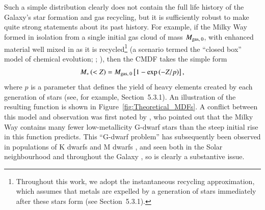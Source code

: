 \documentclass[fleqn,usenatbib]{mnras}
\begin{document}
Such a simple distribution clearly does not contain the full life history of the Galaxy's star formation and gas recycling, but it is sufficiently robust to make quite strong statements about its past history. For example, if the Milky Way formed in isolation from a single initial gas cloud of mass $ M_{\rm{gas,} \: 0}$, with enhanced material well mixed in as it is recycled\footnote{Throughout this work, we adopt the instantaneous recycling approximation, which assumes that metals are expelled by a generation of stars immediately after these stars form (see \citealp{Binney1998GalacticAstronomy} Section~5.3.1).} (a scenario termed the ``closed box'' model of chemical evolution; \citealp{Talbot1971TheModel}; \citealp{Tinsley1974ConstraintsNeighborhood}), then the CMDF takes the simple form 
\begin{equation}
    M_{*} \left( < Z \right) = M_{\rm{gas,} \: 0} \left[ 1 - \exp{ \left( -Z / p \right)} \right],
	\label{eq:closed_box}
\end{equation}
where $p$ is a parameter that defines the yield of heavy elements created by each generation of stars (see, for example, \citealp{Binney1998GalacticAstronomy} Section~5.3.1). An illustration of the resulting function is shown in Figure~\ref{fig:Theoretical_MDFs}. A conflict between this model and observation was first noted by \citet{vandenBergh1962TheAbundances.}, who pointed out that the Milky Way contains many fewer low-metallicity G-dwarf stars than the steep initial rise in this function predicts. This ``G-dwarf problem'' has subsequently been observed in populations of K dwarfs \citep{Casuso2004TheDisc} and M dwarfs \citep{Mould1978InfraredDwarfs, Woolf2012TheGalaxy, Woolf2020TheStars}, and seen both in the Solar neighbourhood \citep[e.g.][]{Rocha-Pinto1996TheNeighbourhood, Gratton1996TheNeighbourhood, Chiappini1996TheModel, Holmberg2007TheDisk} and throughout the Galaxy \citep[e.g.][]{Chiappini2001AbundanceWay, Hayden2015CHEMICALDISK}, so is clearly a substantive issue.
\end{document}
